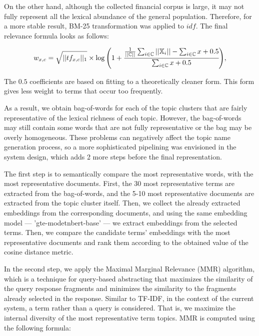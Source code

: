 On the other hand, although the collected financial corpus is large, it may not fully represent all
the lexical abundance of the general population. Therefore, for a more stable result, BM-25
transformation was applied to $idf$. The final relevance formula looks as follows:

\begin{equation}
    w_{x, c} =
    \sqrt{||tf_{x, c}||_1}
    \times
    \log\Bigg(
        1 + \cfrac{
            \frac{1}{||\mathbb{C}||}\sum_{i \in \mathbb{C}}||\mathbb{X}_i|| - \sum_{i \in \mathbb{C}}x + 0.5
        }{
            \sum_{i \in \mathbb{C}}x + 0.5
        }
    \Bigg),
\end{equation}

The $0.5$ coefficients are based on fitting to a theoretically cleaner form. This form gives less weight
to terms that occur too frequently.

As a result, we obtain bag-of-words for each of the topic clusters that are fairly representative
of the lexical richness of each topic. However, the bag-of-words may still contain some words that
are not fully representative or the bag may be overly homogeneous. These problems can negatively affect
the topic name generation process, so a more sophisticated pipelining was envisioned in the system design,
which adds 2 more steps before the final representation.

The first step is to semantically compare the most representative words, with the most representative
documents. First, the 30 most representative terms are extracted from the bag-of-words, and the 5-10 most
representative documents are extracted from the topic cluster itself. Then, we collect the already
extracted embeddings from the corresponding documents, and using the same embedding model ---
'gte-modetnbert-base' --- we extract embeddings from the selected terms. Then, we compare the candidate
terms' embeddings with the most representative documents and rank them according to the obtained value
of the cosine distance metric.

In the second step, we apply the Maximal Marginal Relevance (MMR) algorithm, which is a technique for
query-based abstracting that maximizes the similarity of the query response fragments and minimizes
the similarity to the fragments already selected in the response. Similar to TF-IDF, in the context
of the current system, a term rather than a query is considered. That is, we maximize the internal
diversity of the most representative term topics. MMR is computed using the following formula:

